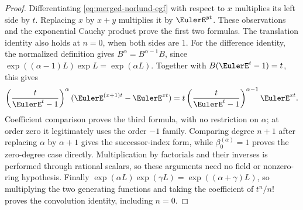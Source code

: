 \documentclass[11pt,a4paper,oneside,openany]{book}
\theoremstyle{definition}
\theoremstyle{remark}
\begin{document}
\begin{proof}
Differentiating \eqref{eq:merged-norlund-egf} with respect to $x$ multiplies
its left side by $t$.  Replacing $x$ by $x+y$ multiplies it by
$\EulerE^{yt}$.  These observations and the exponential Cauchy product prove
the first two formulas.  The translation identity also holds at $n=0$,
when both sides are $1$.
For the difference identity, the normalized definition gives
$B^\alpha=B^{\alpha-1}B$, since
$\exp((\alpha-1)L)\exp L=\exp(\alpha L)$.
Together with $B(\EulerE^t-1)=t$, this gives
\[
 \left(\frac{t}{\EulerE^t-1}\right)^\alpha
 (\EulerE^{(x+1)t}-\EulerE^{xt})
 =t\left(\frac{t}{\EulerE^t-1}\right)^{\alpha-1}\EulerE^{xt}.
\]
Coefficient comparison proves the third formula, with no restriction on
$\alpha$; at order zero it legitimately uses the order $-1$ family.
Comparing degree $n+1$ after replacing $\alpha$ by $\alpha+1$ gives the
successor-index form, while $\beta_0^{(\alpha)}=1$ proves the zero-degree
case directly.  Multiplication by factorials and their inverses is
performed through rational scalars, so these arguments need no field or
nonzero-ring hypothesis.
Finally $\exp(\alpha L)\exp(\gamma L)=\exp((\alpha+\gamma)L)$, so multiplying
the two generating functions and taking the coefficient of $t^n/n!$
proves the convolution identity, including $n=0$.
\end{proof}
\end{document}
